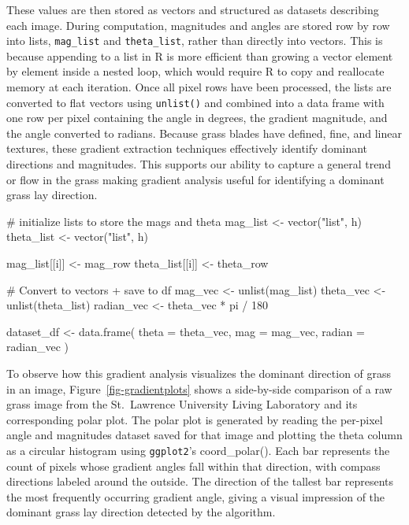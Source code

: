 \documentclass[
]{article}
\newenvironment{Shaded}{\begin{snugshade}}{\end{snugshade}}
\newcommand{\AttributeTok}[1]{\textcolor[rgb]{0.40,0.45,0.13}{#1}}
\newcommand{\CommentTok}[1]{\textcolor[rgb]{0.37,0.37,0.37}{#1}}
\newcommand{\DecValTok}[1]{\textcolor[rgb]{0.68,0.00,0.00}{#1}}
\newcommand{\FunctionTok}[1]{\textcolor[rgb]{0.28,0.35,0.67}{#1}}
\newcommand{\NormalTok}[1]{\textcolor[rgb]{0.00,0.23,0.31}{#1}}
\newcommand{\OtherTok}[1]{\textcolor[rgb]{0.00,0.23,0.31}{#1}}
\newcommand{\SpecialCharTok}[1]{\textcolor[rgb]{0.37,0.37,0.37}{#1}}
\newcommand{\StringTok}[1]{\textcolor[rgb]{0.13,0.47,0.30}{#1}}
\begin{document}
These values are then stored as vectors and structured as datasets
describing each image. During computation, magnitudes and angles are
stored row by row into lists, \texttt{mag\_list} and
\texttt{theta\_list}, rather than directly into vectors. This is because
appending to a list in R is more efficient than growing a vector element
by element inside a nested loop, which would require R to copy and
reallocate memory at each iteration. Once all pixel rows have been
processed, the lists are converted to flat vectors using
\texttt{unlist()} and combined into a data frame with one row per pixel
containing the angle in degrees, the gradient magnitude, and the angle
converted to radians. Because grass blades have defined, fine, and
linear textures, these gradient extraction techniques effectively
identify dominant directions and magnitudes. This supports our ability
to capture a general trend or flow in the grass making gradient analysis
useful for identifying a dominant grass lay direction.

\begin{Shaded}
\begin{Highlighting}[]
\CommentTok{\# initialize lists to store the mags and theta}
\NormalTok{mag\_list }\OtherTok{\textless{}{-}} \FunctionTok{vector}\NormalTok{(}\StringTok{"list"}\NormalTok{, h)}
\NormalTok{theta\_list }\OtherTok{\textless{}{-}} \FunctionTok{vector}\NormalTok{(}\StringTok{"list"}\NormalTok{, h)}

\NormalTok{mag\_list[[i]] }\OtherTok{\textless{}{-}}\NormalTok{ mag\_row}
\NormalTok{theta\_list[[i]] }\OtherTok{\textless{}{-}}\NormalTok{ theta\_row}

\CommentTok{\# Convert to vectors + save to df}
\NormalTok{mag\_vec }\OtherTok{\textless{}{-}} \FunctionTok{unlist}\NormalTok{(mag\_list)}
\NormalTok{theta\_vec }\OtherTok{\textless{}{-}} \FunctionTok{unlist}\NormalTok{(theta\_list)}
\NormalTok{radian\_vec }\OtherTok{\textless{}{-}}\NormalTok{ theta\_vec }\SpecialCharTok{*}\NormalTok{ pi }\SpecialCharTok{/} \DecValTok{180}

\NormalTok{dataset\_df }\OtherTok{\textless{}{-}} \FunctionTok{data.frame}\NormalTok{(}
\AttributeTok{theta =}\NormalTok{ theta\_vec,}
\AttributeTok{mag =}\NormalTok{ mag\_vec,}
\AttributeTok{radian =}\NormalTok{ radian\_vec}
\NormalTok{)}
\end{Highlighting}
\end{Shaded}

To observe how this gradient analysis visualizes the dominant direction
of grass in an image, Figure~\ref{fig-gradientplots} shows a
side-by-side comparison of a raw grass image from the St.~Lawrence
University Living Laboratory and its corresponding polar plot. The polar
plot is generated by reading the per-pixel angle and magnitudes dataset
saved for that image and plotting the theta column as a circular
histogram using \texttt{ggplot2}'s coord\_polar(). Each bar represents
the count of pixels whose gradient angles fall within that direction,
with compass directions labeled around the outside. The direction of the
tallest bar represents the most frequently occurring gradient angle,
giving a visual impression of the dominant grass lay direction detected
by the algorithm.
\end{document}
